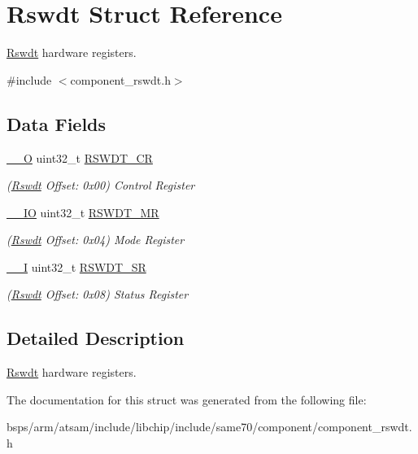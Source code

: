 \hypertarget{structRswdt}{}\section{Rswdt Struct Reference}
\label{structRswdt}


\mbox{\hyperlink{structRswdt}{Rswdt}} hardware registers.  




{\ttfamily \#include $<$component\+\_\+rswdt.\+h$>$}

\subsection*{Data Fields}
\begin{DoxyCompactItemize}
\item 
\mbox{\label{structRswdt_ada77f6d1aaee3447397c1a11d514c118}} 
\mbox{\hyperlink{core__cm7_8h_a7e25d9380f9ef903923964322e71f2f6}{\+\_\+\+\_\+O}} uint32\+\_\+t \mbox{\hyperlink{structRswdt_ada77f6d1aaee3447397c1a11d514c118}{R\+S\+W\+D\+T\+\_\+\+CR}}
\begin{DoxyCompactList}\small\item\em (\mbox{\hyperlink{structRswdt}{Rswdt}} Offset\+: 0x00) Control Register \end{DoxyCompactList}\item 
\mbox{\label{structRswdt_a72816692da9d06219e8df3fad4dc517d}} 
\mbox{\hyperlink{core__cm7_8h_aec43007d9998a0a0e01faede4133d6be}{\+\_\+\+\_\+\+IO}} uint32\+\_\+t \mbox{\hyperlink{structRswdt_a72816692da9d06219e8df3fad4dc517d}{R\+S\+W\+D\+T\+\_\+\+MR}}
\begin{DoxyCompactList}\small\item\em (\mbox{\hyperlink{structRswdt}{Rswdt}} Offset\+: 0x04) Mode Register \end{DoxyCompactList}\item 
\mbox{\label{structRswdt_a031e44c611ad614ea224c82e099b4708}} 
\mbox{\hyperlink{core__cm7_8h_af63697ed9952cc71e1225efe205f6cd3}{\+\_\+\+\_\+I}} uint32\+\_\+t \mbox{\hyperlink{structRswdt_a031e44c611ad614ea224c82e099b4708}{R\+S\+W\+D\+T\+\_\+\+SR}}
\begin{DoxyCompactList}\small\item\em (\mbox{\hyperlink{structRswdt}{Rswdt}} Offset\+: 0x08) Status Register \end{DoxyCompactList}\end{DoxyCompactItemize}


\subsection{Detailed Description}
\mbox{\hyperlink{structRswdt}{Rswdt}} hardware registers. 

The documentation for this struct was generated from the following file\+:\begin{DoxyCompactItemize}
\item 
bsps/arm/atsam/include/libchip/include/same70/component/component\+\_\+rswdt.\+h\end{DoxyCompactItemize}
